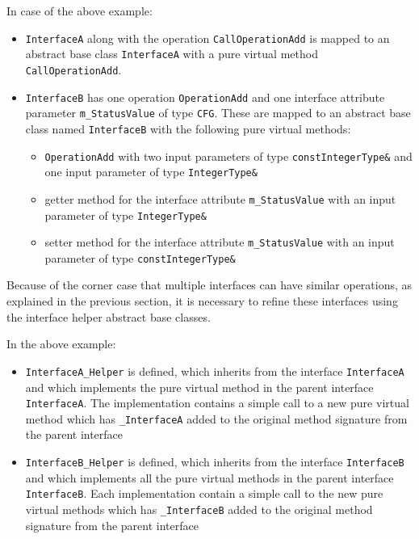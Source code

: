 In case of the above example:
\begin{itemize}
\item \texttt{InterfaceA} along with the operation \texttt{CallOperationAdd} is mapped to an abstract base class \texttt{InterfaceA} with a pure virtual method \texttt{CallOperationAdd}. 
\item \texttt{InterfaceB} has one operation \texttt{OperationAdd} and one interface attribute parameter \texttt{m\_StatusValue} of type \texttt{CFG}. These are mapped to an abstract base class named \texttt{InterfaceB} with the following pure virtual methods:
\begin{itemize}
\item \texttt{OperationAdd} with two input parameters of type \texttt{const\allowbreak  IntegerType\&} and one input parameter of type \texttt{IntegerType\&}
\item getter method for the interface attribute \texttt{m\_StatusValue} with an input parameter of type \texttt{IntegerType\&}
\item setter method for the interface attribute \texttt{m\_StatusValue} with an input parameter of type \texttt{const\allowbreak  IntegerType\&}
\end{itemize} 
\end{itemize}

Because of the corner case that multiple interfaces can have similar operations, as explained in the previous section, it is necessary to refine these interfaces using the interface helper abstract base classes.

In the above example:
\begin{itemize}
\item \texttt{InterfaceA\allowbreak\_Helper} is defined, which inherits from the interface \texttt{InterfaceA} and which implements the pure virtual method in the parent interface \texttt{InterfaceA}. The implementation contains a simple call to a new pure virtual method which has \texttt{\_InterfaceA} added to the original method signature from the parent interface

\item \texttt{InterfaceB\allowbreak\_Helper} is defined, which inherits from the interface \texttt{InterfaceB} and which implements all the pure virtual methods in the parent interface \texttt{InterfaceB}. Each implementation contain a simple call to the new pure virtual methods which has \texttt{\_InterfaceB} added to the original method signature from the parent interface    
\end{itemize}


